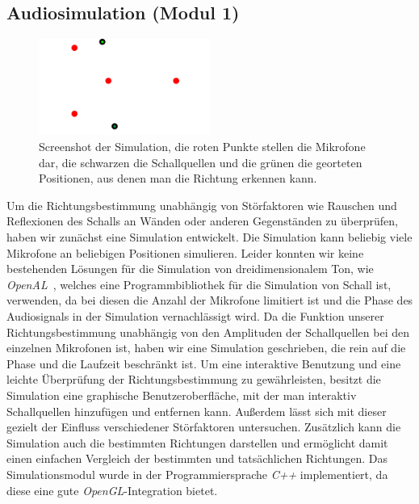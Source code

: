 \subsection{Audiosimulation (Modul 1)}
\begin{figure}
    \centering
    \includegraphics[width=0.5\textwidth]{img/bildsimulation}
    \caption{Screenshot der Simulation, die roten Punkte stellen die Mikrofone dar, die schwarzen die Schallquellen und die grünen die georteten Positionen, aus denen man die Richtung erkennen kann.}
\end{figure}
Um die Richtungsbestimmung unabhängig von Störfaktoren wie Rauschen und Reflexionen des Schalls an Wänden oder anderen Gegenständen zu überprüfen, haben wir zunächst eine Simulation entwickelt. Die Simulation kann beliebig viele Mikrofone an beliebigen Positionen simulieren. Leider konnten wir keine bestehenden Lösungen für die Simulation von dreidimensionalem Ton, wie \textit{OpenAL}~\cite{OpenAL}, welches eine Programmbibliothek für die Simulation von Schall ist, verwenden, da bei diesen die Anzahl der Mikrofone limitiert ist und die Phase des Audiosignals in der Simulation vernachlässigt wird. Da die Funktion unserer Richtungsbestimmung unabhängig von den Amplituden der Schallquellen bei den einzelnen Mikrofonen ist, haben wir eine Simulation geschrieben, die rein auf die Phase und die Laufzeit beschränkt ist. Um eine interaktive Benutzung und eine leichte Überprüfung der Richtungsbestimmung zu gewährleisten, besitzt die Simulation eine graphische Benutzeroberfläche, mit der man interaktiv Schallquellen hinzufügen und entfernen kann. Außerdem lässt sich mit dieser gezielt der Einfluss verschiedener Störfaktoren untersuchen. Zusätzlich kann die Simulation auch die bestimmten Richtungen darstellen und ermöglicht damit einen einfachen Vergleich der bestimmten und tatsächlichen Richtungen. Das Simulationsmodul wurde in der Programmiersprache \textit{C++} implementiert, da diese eine gute \textit{OpenGL}-Integration bietet.


